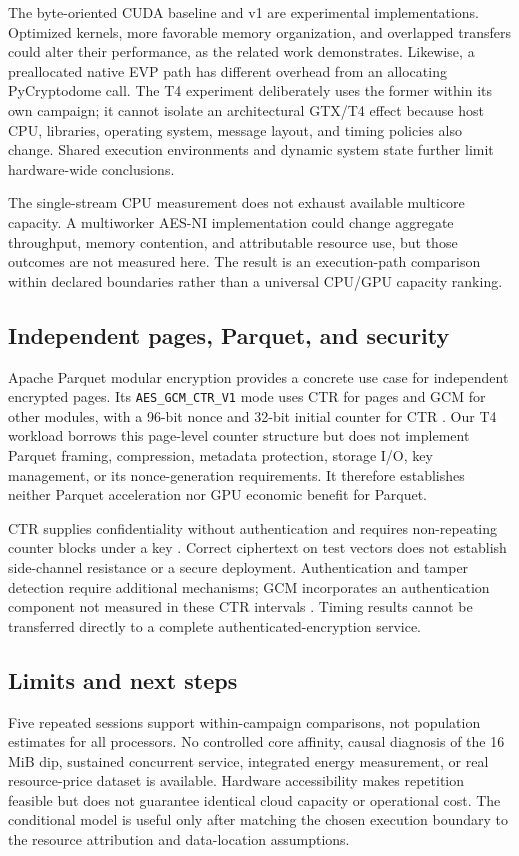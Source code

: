 \documentclass[11pt,a4paper]{article}
\begin{document}
The byte-oriented CUDA baseline and v1 are experimental implementations. Optimized kernels, more favorable memory organization, and overlapped transfers could alter their performance, as the related work demonstrates. Likewise, a preallocated native EVP path has different overhead from an allocating PyCryptodome call. The T4 experiment deliberately uses the former within its own campaign; it cannot isolate an architectural GTX/T4 effect because host CPU, libraries, operating system, message layout, and timing policies also change. Shared execution environments and dynamic system state further limit hardware-wide conclusions.

The single-stream CPU measurement does not exhaust available multicore capacity. A multiworker AES-NI implementation could change aggregate throughput, memory contention, and attributable resource use, but those outcomes are not measured here. The result is an execution-path comparison within declared boundaries rather than a universal CPU/GPU capacity ranking.

\subsection{Independent pages, Parquet, and security}
Apache Parquet modular encryption provides a concrete use case for independent encrypted pages. Its \texttt{AES\_GCM\_CTR\_V1} mode uses CTR for pages and GCM for other modules, with a 96-bit nonce and 32-bit initial counter for CTR \citep{parquet_encrypt}. Our T4 workload borrows this page-level counter structure but does not implement Parquet framing, compression, metadata protection, storage I/O, key management, or its nonce-generation requirements. It therefore establishes neither Parquet acceleration nor GPU economic benefit for Parquet.

CTR supplies confidentiality without authentication and requires non-repeating counter blocks under a key \citep{nist_ctr2001}. Correct ciphertext on test vectors does not establish side-channel resistance or a secure deployment. Authentication and tamper detection require additional mechanisms; GCM incorporates an authentication component not measured in these CTR intervals \citep{nist_gcm2007}. Timing results cannot be transferred directly to a complete authenticated-encryption service.

\subsection{Limits and next steps}
Five repeated sessions support within-campaign comparisons, not population estimates for all processors. No controlled core affinity, causal diagnosis of the 16 MiB dip, sustained concurrent service, integrated energy measurement, or real resource-price dataset is available. Hardware accessibility makes repetition feasible but does not guarantee identical cloud capacity or operational cost. The conditional model is useful only after matching the chosen execution boundary to the resource attribution and data-location assumptions.
\end{document}
